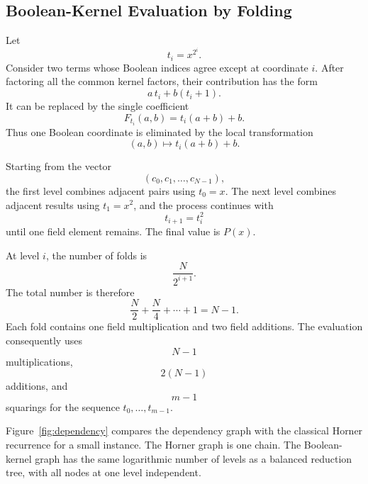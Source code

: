 \subsection{Boolean-Kernel Evaluation by Folding}
\label{sec:kernel-fold}

Let
\[
t_i=x^{2^i}.
\]
Consider two terms whose Boolean indices agree except at coordinate \(i\).
After factoring all the common kernel factors, their contribution has the
form
\[
a\,t_i+b(t_i+1).
\]
It can be replaced by the single coefficient
\[
F_{t_i}(a,b)
=
t_i(a+b)+b.
\]
Thus one Boolean coordinate is eliminated by the local transformation
\[
\boxed{
(a,b)\longmapsto t_i(a+b)+b.
}
\]

Starting from the vector
\[
(c_0,c_1,\ldots,c_{N-1}),
\]
the first level combines adjacent pairs using \(t_0=x\).  The next level
combines adjacent results using \(t_1=x^2\), and the process continues with
\[
t_{i+1}=t_i^2
\]
until one field element remains.  The final value is \(P(x)\).

At level \(i\), the number of folds is
\[
\frac{N}{2^{i+1}}.
\]
The total number is therefore
\[
\frac{N}{2}
+\frac{N}{4}
+\cdots+1
=
N-1.
\]
Each fold contains one field multiplication and two field additions.  The
evaluation consequently uses
\[
N-1
\]
multiplications,
\[
2(N-1)
\]
additions, and
\[
m-1
\]
squarings for the sequence \(t_0,\ldots,t_{m-1}\).

Figure~\ref{fig:dependency} compares the dependency graph with the
classical Horner recurrence for a small instance.  The Horner graph is one
chain.  The Boolean-kernel graph has the same logarithmic number of levels
as a balanced reduction tree, with all nodes at one level independent.

